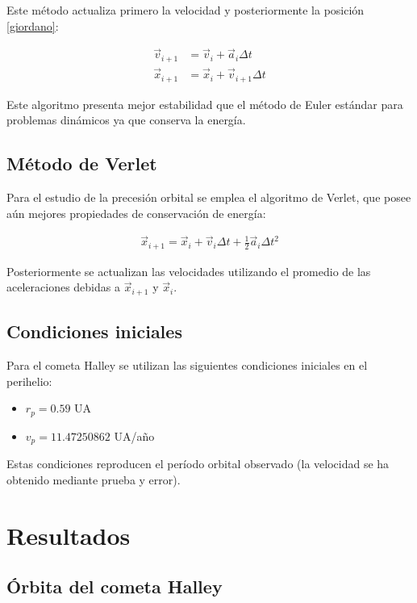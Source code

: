 \documentclass[11pt,a4paper]{article}
\begin{document}
Este método actualiza primero la velocidad y posteriormente la posición \ref{giordano}:

\begin{align}
\vec{v}_{i+1} &= \vec{v}_i + \vec{a}_i \Delta t \\
\vec{x}_{i+1} &= \vec{x}_i + \vec{v}_{i+1} \Delta t
\end{align}

Este algoritmo presenta mejor estabilidad que el método de Euler estándar para problemas dinámicos ya que conserva la energía.

\subsection{Método de Verlet}

Para el estudio de la precesión orbital se emplea el algoritmo de Verlet, que posee aún mejores propiedades de conservación de energía:

\begin{align}
\vec{x}_{i+1} = \vec{x}_i + \vec{v}_i\Delta t + \frac{1}{2}\vec{a}_i\Delta t^2
\end{align}

Posteriormente se actualizan las velocidades utilizando el promedio de las aceleraciones debidas a $\vec{x}_{i+1}$ y $\vec{x}_i$.

\subsection{Condiciones iniciales}

Para el cometa Halley se utilizan las siguientes condiciones iniciales en el perihelio:

\begin{itemize}
\item $r_p = 0.59$ UA
\item $v_p = 11.47250862$ UA/año
\end{itemize}

Estas condiciones reproducen el período orbital observado (la velocidad se ha obtenido mediante prueba y error).

\section{Resultados}

\subsection{Órbita del cometa Halley}
\end{document}
